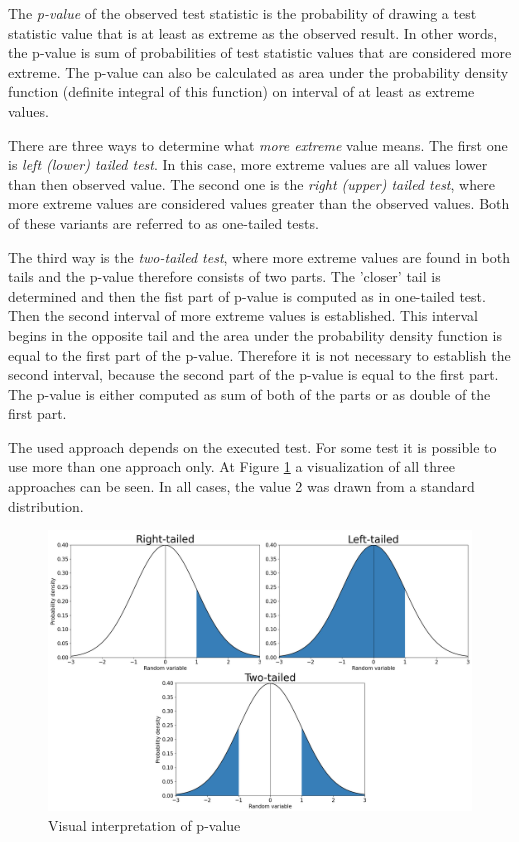 \documentclass[
  digital,     %
  oneside,     %
  nosansbold,  %
  nocolorbold, %
  nolof,         %
  nolot,         %
]{fithesis4}
\begin{document}
The \emph{p-value} of the observed test statistic is the probability of drawing a test statistic value that is at least as extreme as the observed result. In other words, the p-value is sum of probabilities of test statistic values that are considered more extreme. The p-value can also be calculated as area under the probability density function (definite integral of this function) on interval of at least as extreme values.

There are three ways to determine what \emph{more extreme} value means. The first one is \emph{left (lower) tailed test}. In this case, more extreme values are all values lower than then observed value. The second one is the \emph{right (upper) tailed test}, where more extreme values are considered values greater than the observed values. Both of these variants are referred to as one-tailed tests.

The third way is the \emph{two-tailed test}, where more extreme values are found in both tails and the p-value therefore consists of two parts. The 'closer' tail is determined and then the fist part of p-value is computed as in one-tailed test. Then the second interval of more extreme values is established. This interval begins in the opposite tail and the area under the probability density function is equal to the first part of the p-value. Therefore it is not necessary to establish the second interval, because the second part of the p-value is equal to the first part. The p-value is either computed as sum of both of the parts or as double of the first part. 

The used approach depends on the executed test. For some test it is possible to use more than one approach only. At Figure \ref{fig:p_value} a visualization of all three approaches can be seen. In all cases, the value 2 was drawn from a standard distribution.

\begin{figure}
  \begin{center}
    \includegraphics[width=12.5cm]{figures/p-value.png}
  \end{center}
  \caption{Visual interpretation of p-value }
  \label{fig:p_value}
\end{figure}
\end{document}
